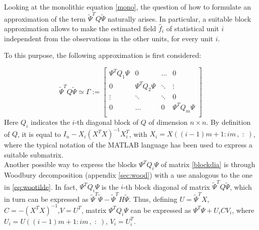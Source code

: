 Looking at the monolithic equation \ref{mono}, the question of how to formulate an approximation of the term $\tilde{\Psi}^TQ\tilde{\Psi}$ naturally arises. 
In particular, a suitable block approximation allows to make the estimated field $\hat{f}_i$ of statistical unit $i$ independent from the observations in the other units, for every unit $i$.

To this purpose, the following approximation is first considered:

\begin{equation}
    \label{blockdia}
    \tilde{\Psi}^TQ\tilde{\Psi}\simeq \Gamma := 
    \begin{bmatrix}
        \Psi^TQ_1\Psi & 0& \dots & 0\\
        0 & \Psi^TQ_2\Psi & \ddots & \vdots\\
        \vdots& \ddots& \ddots & 0 \\
        0 & \dots & 0 & \Psi^TQ_m\Psi\\
    \end{bmatrix}    
\end{equation}
Here $Q_i$ indicates the $i$-th diagonal block of $Q$ of dimension $n \times n$. By definition of $Q$, it is equal to $I_n-X_i\left(X^TX\right)^{-1}X_i^T$, with $X_i=X\left(\left(i-1\right)m+1 : im\,, \;:\; \right)$, where the typical notation of the MATLAB language has been used to express a suitable submatrix.\\
Another possible way to express the blocks $\Psi^TQ_i\Psi$ of matrix \ref{blockdia} is through Woodbury decomposition (appendix \ref{sec:wood}) with a use analogous to the one in \ref{eq:wootilde}. In fact, $\Psi^TQ_i\Psi$ is the $i$-th block diagonal of matrix $\tilde{\Psi}^TQ\tilde{\Psi}$, which in turn can be expressed as $\tilde{\Psi}^T\tilde{\Psi}-\tilde{\Psi}^TH\tilde{\Psi}$. Thus, defining $U = \tilde{\Psi}^TX$, $C = -\left(X^TX\right)^{-1}$,$V =U^T$, matrix $\Psi^TQ_i\Psi$ can be expressed as $\Psi^T\Psi +  U_iCV_i $, where $U_i = U\left(\left(i-1\right)m+1 : im\,, \;:\;\right)$, $V_i = U_i^T $.

